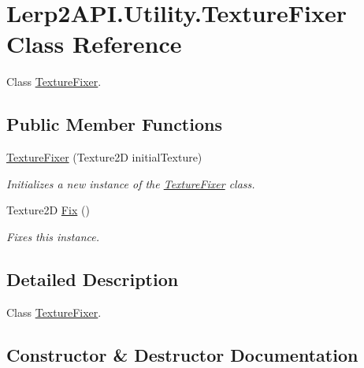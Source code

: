 \hypertarget{class_lerp2_a_p_i_1_1_utility_1_1_texture_fixer}{}\section{Lerp2\+A\+P\+I.\+Utility.\+Texture\+Fixer Class Reference}
\label{class_lerp2_a_p_i_1_1_utility_1_1_texture_fixer}


Class \hyperlink{class_lerp2_a_p_i_1_1_utility_1_1_texture_fixer}{Texture\+Fixer}.  


\subsection*{Public Member Functions}
\begin{DoxyCompactItemize}
\item 
\hyperlink{class_lerp2_a_p_i_1_1_utility_1_1_texture_fixer_a9d143e2c76193174a15573210b6cffad}{Texture\+Fixer} (Texture2D initial\+Texture)
\begin{DoxyCompactList}\small\item\em Initializes a new instance of the \hyperlink{class_lerp2_a_p_i_1_1_utility_1_1_texture_fixer}{Texture\+Fixer} class. \end{DoxyCompactList}\item 
Texture2D \hyperlink{class_lerp2_a_p_i_1_1_utility_1_1_texture_fixer_a65f0a37ada97895b5045b94192e28d9f}{Fix} ()
\begin{DoxyCompactList}\small\item\em Fixes this instance. \end{DoxyCompactList}\end{DoxyCompactItemize}


\subsection{Detailed Description}
Class \hyperlink{class_lerp2_a_p_i_1_1_utility_1_1_texture_fixer}{Texture\+Fixer}. 



\subsection{Constructor \& Destructor Documentation}
\mbox{\label{class_lerp2_a_p_i_1_1_utility_1_1_texture_fixer_a9d143e2c76193174a15573210b6cffad}} 
